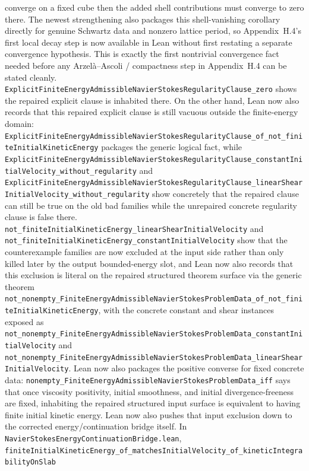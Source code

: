 \documentclass[11pt]{article}
\begin{document}
converge on a fixed cube then the added shell contributions must converge to
zero there.  The newest strengthening also packages this shell-vanishing
corollary directly for genuine Schwartz data and nonzero lattice period, so
Appendix~H.4's first local decay step is now available in Lean without first
restating a separate convergence hypothesis.  This is exactly the first
nontrivial convergence fact needed before any Arzel\`a--Ascoli / compactness
step in Appendix~H.4 can be stated cleanly.
\texttt{ExplicitFiniteEnergyAdmissibleNavierStokesRegularityClause\_zero}
shows the repaired explicit clause is inhabited there.  On the other hand,
Lean now also records that this repaired explicit clause is still vacuous
outside the finite-energy domain:
\texttt{ExplicitFiniteEnergyAdmissibleNavierStokesRegularityClause\_of\_not\_finiteInitialKineticEnergy}
packages the generic logical fact, while
\texttt{ExplicitFiniteEnergyAdmissibleNavierStokesRegularityClause\_constantInitialVelocity\_without\_regularity}
and
\texttt{ExplicitFiniteEnergyAdmissibleNavierStokesRegularityClause\_linearShearInitialVelocity\_without\_regularity}
show concretely that the repaired clause can still be true on the old bad
families while the unrepaired concrete regularity clause is false there.
\texttt{not\_finiteInitialKineticEnergy\_linearShearInitialVelocity} and
\texttt{not\_finiteInitialKineticEnergy\_constantInitialVelocity} show that the
counterexample families are now excluded at the input side rather than only
killed later by the output bounded-energy slot, and Lean now also records that
this exclusion is literal on the repaired structured theorem surface via the
generic theorem
\texttt{not\_nonempty\_FiniteEnergyAdmissibleNavierStokesProblemData\_of\_not\_finiteInitialKineticEnergy},
with the concrete constant and shear instances exposed as
\texttt{not\_nonempty\_FiniteEnergyAdmissibleNavierStokesProblemData\_constantInitialVelocity}
and
\texttt{not\_nonempty\_FiniteEnergyAdmissibleNavierStokesProblemData\_linearShearInitialVelocity}.
Lean now also packages the positive converse for fixed concrete data:
\texttt{nonempty\_FiniteEnergyAdmissibleNavierStokesProblemData\_iff} says that
once viscosity positivity, initial smoothness, and initial divergence-freeness
are fixed, inhabiting the repaired structured input surface is equivalent to
having finite initial kinetic energy.
Lean now also pushes that input exclusion down to the corrected
energy/continuation bridge itself.  In
\texttt{NavierStokesEnergyContinuationBridge.lean},
\texttt{finiteInitialKineticEnergy\_of\_matchesInitialVelocity\_of\_kineticIntegrabilityOnSlab}
\end{document}
